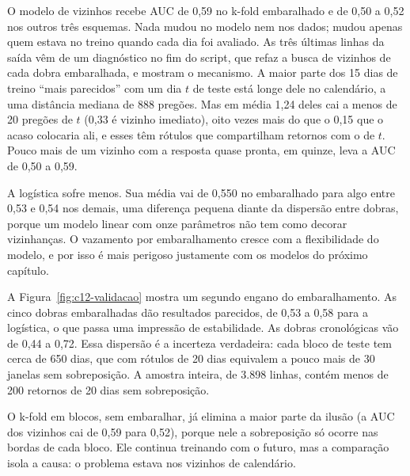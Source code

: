 
O modelo de vizinhos recebe AUC de 0,59 no k-fold embaralhado e de 0,50 a 0,52 nos outros três esquemas. Nada mudou no modelo nem nos dados; mudou apenas quem estava no treino quando cada dia foi avaliado. As três últimas linhas da saída vêm de um diagnóstico no fim do script, que refaz a busca de vizinhos de cada dobra embaralhada, e mostram o mecanismo. A maior parte dos 15 dias de treino ``mais parecidos'' com um dia $t$ de teste está longe dele no calendário, a uma distância mediana de 888 pregões. Mas em média 1,24 deles cai a menos de 20 pregões de $t$ (0,33 é vizinho imediato), oito vezes mais do que o 0,15 que o acaso colocaria ali, e esses têm rótulos que compartilham retornos com o de $t$. Pouco mais de um vizinho com a resposta quase pronta, em quinze, leva a AUC de 0,50 a 0,59.

A logística sofre menos. Sua média vai de 0,550 no embaralhado para algo entre 0,53 e 0,54 nos demais, uma diferença pequena diante da dispersão entre dobras, porque um modelo linear com onze parâmetros não tem como decorar vizinhanças. O vazamento por embaralhamento cresce com a flexibilidade do modelo, e por isso é mais perigoso justamente com os modelos do próximo capítulo.

A Figura~\ref{fig:c12-validacao} mostra um segundo engano do embaralhamento. As cinco dobras embaralhadas dão resultados parecidos, de 0,53 a 0,58 para a logística, o que passa uma impressão de estabilidade. As dobras cronológicas vão de 0,44 a 0,72. Essa dispersão é a incerteza verdadeira: cada bloco de teste tem cerca de 650 dias, que com rótulos de 20 dias equivalem a pouco mais de 30 janelas sem sobreposição. A amostra inteira, de 3.898 linhas, contém menos de 200 retornos de 20 dias sem sobreposição.

O k-fold em blocos, sem embaralhar, já elimina a maior parte da ilusão (a AUC dos vizinhos cai de 0,59 para 0,52), porque nele a sobreposição só ocorre nas bordas de cada bloco. Ele continua treinando com o futuro, mas a comparação isola a causa: o problema estava nos vizinhos de calendário.

